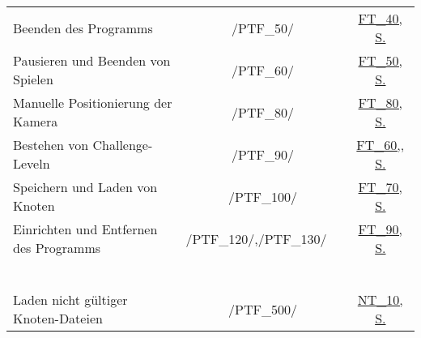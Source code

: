 \begin{longtable}{p{0.5\hsize}p{0.275\hsize}p{0.275\hsize}}
	  \multicolumn{1}{L{6.5cm}}{Beenden des Programms}
	& \multicolumn{1}{c}{/PTF\_50/}
	& \multicolumn{1}{c}{\hyperref[FT:40]{FT\_40, S. \pageref{FT:40}}}
	
	\\
	
	  \multicolumn{1}{L{6.5cm}}{Pausieren und Beenden von Spielen}
	& \multicolumn{1}{c}{/PTF\_60/}
	& \multicolumn{1}{c}{\hyperref[FT:50]{FT\_50, S. \pageref{FT:50}}}
	
	\\
	
	  \multicolumn{1}{L{6.5cm}}{Manuelle Positionierung der Kamera}
	& \multicolumn{1}{c}{/PTF\_80/}
	& \multicolumn{1}{c}{\hyperref[FT:80]{FT\_80, S. \pageref{FT:80}}}
	
	\\
	
	  \multicolumn{1}{L{6.5cm}}{Bestehen von Challenge-Leveln}
	& \multicolumn{1}{c}{/PTF\_90/}
	& \multicolumn{1}{c}{\hyperref[FT:60]{FT\_60,, S. \pageref{FT:60}}}
	
	\\
	
	  \multicolumn{1}{L{6.5cm}}{Speichern und Laden von Knoten}
	& \multicolumn{1}{c}{/PTF\_100/}
	& \multicolumn{1}{c}{\hyperref[FT:70]{FT\_70, S. \pageref{FT:70}}}
	
	\\
	
	  \multicolumn{1}{L{6.5cm}}{Einrichten und Entfernen des Programms}
	& \multicolumn{1}{C{3cm}}{/PTF\_120/,\newline/PTF\_130/~~}
	& \multicolumn{1}{c}{\hyperref[FT:90]{FT\_90, S. \pageref{FT:90}}}
	
	\\
	


\newpage




	  \multicolumn{3}{l}{\textbf{Negativtests:}}
	  
	\\
	
	  \multicolumn{3}{l}{~}
	  
	\\
	
	  \multicolumn{1}{L{6.5cm}}{Laden nicht gültiger Knoten-Dateien}
	& \multicolumn{1}{c}{/PTF\_500/}
	& \multicolumn{1}{c}{\hyperref[NT:10]{NT\_10, S. \pageref{NT:10}}}
	
	\\
	

\end{longtable}
